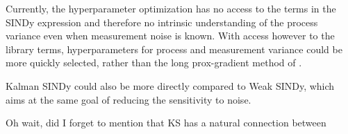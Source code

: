 \documentclass{article}
\begin{document}
Currently, the hyperparameter optimization has no access to the terms in the SINDy expression and therefore no intrinsic understanding of the process variance even when measurement noise is known.  With access however to the library terms, hyperparameters for process and measurement variance could be more quickly selected, rather than the long prox-gradient method of \cite{Barratt2020}.

Kalman SINDy could also be more directly compared to Weak SINDy, which aims at the same goal of reducing the sensitivity to noise.

Oh wait, did I forget to mention that KS has a natural connection between


\end{document}
